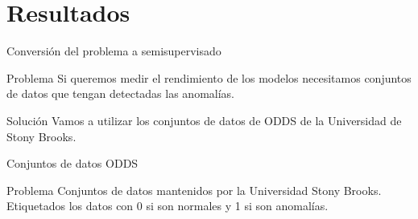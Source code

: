 \documentclass[10pt]{beamer}
\begin{document}
\section{Resultados}

\begin{frame}[fragile]{Conversión del problema a semisupervisado}
\vspace{10px}
\pause
{}

\begin{alertblock}{Problema}
	Si queremos medir el rendimiento de los modelos necesitamos conjuntos de datos que tengan detectadas las anomalías.
\end{alertblock}

\pause

\begin{alertblock}{Solución}
	Vamos a utilizar los conjuntos de datos de ODDS de la Universidad de Stony Brooks.
\end{alertblock}

\end{frame}

\begin{frame}[fragile]{Conjuntos de datos ODDS}
\vspace{10px}
\pause
{}

\begin{block}{Problema}
	Conjuntos de datos mantenidos por la Universidad Stony Brooks. Etiquetados los datos con 0 si son normales y 1 si son anomalías.
\end{block}

\end{frame}
\end{document}
